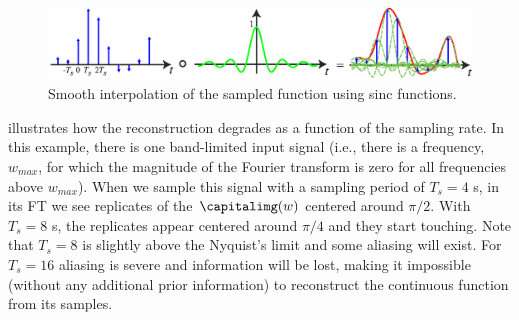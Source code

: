 \begin{figure}[h]
    \centerline{
        \includegraphics[width=1\linewidth]{figures/Image_processing_sampling/sampling_reconstruction2.eps}
    }
    \caption{Smooth interpolation of the sampled function using sinc functions.}
    \label{fig:sampling_reconstruction2}
\end{figure}






\Fig{\ref{fig:alias1d}} illustrates how the reconstruction degrades as a function of the sampling rate. In this example, there is one band-limited input signal (i.e., there is a frequency, $w_{max}$, for which the magnitude of the Fourier transform is zero for all frequencies above $w_{max}$). When we sample this signal with a sampling period of $T_s = 4$ s, in its FT we see replicates of the $\capitalimg(w)$ centered around $\pi/2$. With $T_s=8$ s, the replicates appear centered around $\pi/4$ and they start touching. Note that $T_s=8$ is slightly above the Nyquist's limit and some aliasing will exist. For $T_s=16$ aliasing is severe and information will be lost, making it impossible (without any additional prior information) to reconstruct the continuous function from its samples.



